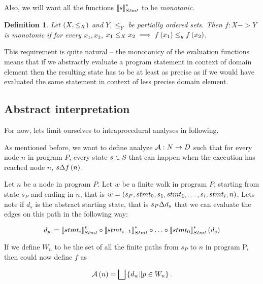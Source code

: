 \documentclass[..thesis.tex]{subfiles}
\newtheorem{defin}{Definition}[section]
\begin{document}
Also, we will want all the functions $\left\llbracket s \right\rrbracket_{Stmt}^{*}$ to be \textit{monotonic}.

\begin{defin}
Let $\left( X, \leq_X \right)$ and $Y, \leq_Y$ be partially ordered sets. Then $f : X -> Y$ is \textit{monotonic} if for every $x_1, x_2$, $x_1 \leq_X x_2 \implies f \left( x_1 \right) \leq_y f \left( x_2 \right)$.   
\end{defin}

This requirement is quite natural -- the monotonicy of the evaluation functions means that if we abstractly evaluate a program statement in context of domain element then the resulting state has to be at least as precise as if we would have evaluated the same statement in context of less precise domain element.  


\subsection{Abstract interpretation}

For now, lets limit ourselves to intraprocedural analyses in following.
 
As mentioned before, we want to define analyze $\mathcal{A} : N \to D$ such that for every node $n$ in program $P$, every state $s \in \textsl{S}$ that can happen when the execution has reached node $n$, $s \Delta f \left( n \right)$.
  
Let $n$ be a node in program $P$. Let $w$ be a finite walk in program $P$, starting from state $s_P$ and ending in $n$, that is $w = \left( s_P, stmt_0, s_1, stmt_1, \ldots, s_i, stmt_i, n \right)$. Lets note if $d_s$ is the abstract starting state, that is $s_P \Delta d_s$  that we can evaluate the edges on this path in the following way:

\begin{equation*}
d_w = \left\llbracket stmt_i \right\rrbracket_{Stmt}^{*} \circ \left\llbracket stmt_{i-1} \right\rrbracket_{Stmt}^{*} \circ \ldots \circ  \left\llbracket stmt_0 \right\rrbracket_{Stmt}^{*} \left( d_s \right)  
\end{equation*}
  
If we define $W_n$ to be the set of all the finite paths from $s_P$ to $n$ in program P, then could now define $f$ as

\begin{equation*}
\mathcal{A} \left( n \right) = \bigsqcup \left\lbrace d_w \| p \in W_n \right\rbrace \text{.} 
\end{equation*}  
\end{document}

